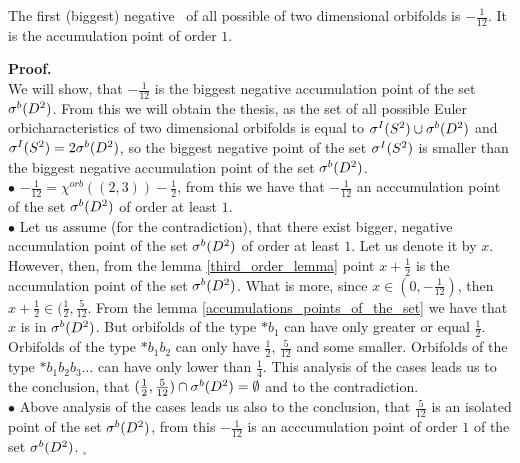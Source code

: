 \begin{theorem}
The first (biggest) negative \apots\ of all possible \Eoc of two dimensional orbifolds is 
$-\frac{1}{12}$. It is the accumulation point of order $1$. 
\end{theorem}
\noindent\textbf{Proof.} \\
We will show, that $-\frac{1}{12}$ is the biggest negative accumulation point of the set ${\mathcal{\sigma}^b(D^2)}$. 
From this we will obtain the thesis, as the set of all possible Euler orbicharacteristics 
of two dimensional orbifolds is equal to ${\mathcal{\sigma}^I(S^2)} \cup {\mathcal{\sigma}^b(D^2)}$ and ${\mathcal{\sigma}^I(S^2)} = 2{\mathcal{\sigma}^b(D^2)}$, so 
the biggest negative point of the set ${\mathcal{\sigma}^I(S^2)}$ is smaller than the biggest negative accumulation 
point of the set ${\mathcal{\sigma}^b(D^2)}$. \\
$\bullet$ $-\frac{1}{12}=\chi^{orb}((2,3))-\frac{1}{2}$, from this we have that $-\frac{1}{12}$ 
an acccumulation point of the set ${\mathcal{\sigma}^b(D^2)}$ of order at least $1$. \\
$\bullet$ Let us assume (for the contradiction), that there exist bigger, negative 
accumulation point of the set ${\mathcal{\sigma}^b(D^2)}$ of order at least $1$. Let us denote it by $x$. \\
However, then, from the lemma \ref{third_order_lemma} point $x+\frac{1}{2}$ is the accumulation 
point of the set ${\mathcal{\sigma}^b(D^2)}$. What is more, since $x\in (0, -\frac{1}{12})$, then $x+\frac{1}{2} 
\in (\frac{1}{2}, \frac{5}{12}$. From the lemma \ref{accumulations_points_of_the_set} we 
have that $x$ is in ${\mathcal{\sigma}^b(D^2)}$. But orbifolds of the type $*b_1$ can have \Eoc only greater or 
equal $\frac{1}{2}$. Orbifolds of the type $*b_1b_2$ can only have \Eoc $\frac{1}{2}$, 
$\frac{5}{12}$ and some smaller. Orbifolds of the type $*b_1b_2b_3\dots$ can have \Eoc only 
lower than $\frac{1}{4}$. This analysis of the cases leads us to the conclusion, that 
$(\frac{1}{2},\frac{5}{12})\cap {\mathcal{\sigma}^b(D^2)}=\emptyset$ and to the contradiction. \\
$\bullet$ Above analysis of the cases leads us also to the conclusion, that $\frac{5}{12}$ 
is 
an isolated point of the set ${\mathcal{\sigma}^b(D^2)}$, from this $-\frac{1}{12}$ is an acccumulation point 
of order $1$ of the set ${\mathcal{\sigma}^b(D^2)}$. $_\square$ \\ 
 








